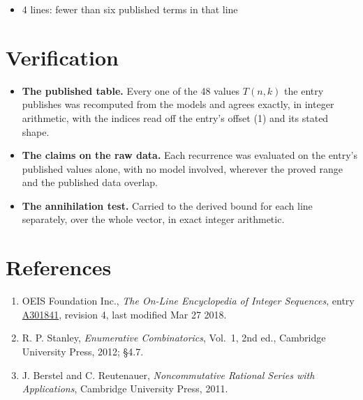 \documentclass[11pt]{article}
\theoremstyle{definition}
\begin{document}
\begin{itemize}

\item 4 lines: fewer than six published terms in that line

\end{itemize}

\section{Verification}

\begin{itemize}

\item {\bfseries The published table.} Every one of the 48 values $T(n,k)$ the entry publishes was recomputed from the models and agrees exactly, in integer arithmetic, with the indices read off the entry's offset (1) and its stated shape.

\item {\bfseries The claims on the raw data.} Each recurrence was evaluated on the entry's published values alone, with no model involved, wherever the proved range and the published data overlap.

\item {\bfseries The annihilation test.} Carried to the derived bound for each line separately, over the whole vector, in exact integer arithmetic.

\end{itemize}

\section{References}

\begin{enumerate}

\item OEIS Foundation Inc., \emph{The On-Line Encyclopedia of Integer Sequences}, entry \href{https://oeis.org/A301841}{A301841}, revision 4, last modified Mar 27 2018.

\item R. P. Stanley, \emph{Enumerative Combinatorics}, Vol.~1, 2nd ed., Cambridge University Press, 2012; \S4.7.

\item J. Berstel and C. Reutenauer, \emph{Noncommutative Rational Series with Applications}, Cambridge University Press, 2011.

\end{enumerate}
\end{document}
